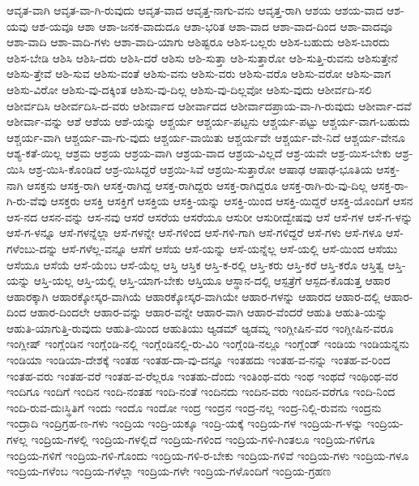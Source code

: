 {ಆವೃತ-ವಾಗಿ
ಆವೃತ-ವಾ-ಗಿ-ರುವುದು
ಆವೃತ-ವಾದ
ಆವೃತ್ತ-ನಾಗು-ವನು
ಆವೃತ್ತ-ರಾಗಿ
ಆಶಯ
ಆಶಯ-ವಾದ
ಆಶ-ಯವು
ಆಶ-ಯವೂ
ಆಶಾ
ಆಶಾ-ಜನಕ-ವಾದುದೂ
ಆಶಾ-ಭರಿತ
ಆಶಾ-ವಾದ
ಆಶಾ-ವಾದ-ದಿಂದ
ಆಶಾ-ವಾದವೂ
ಆಶಾ-ವಾದಿ
ಆಶಾ-ವಾದಿ-ಗಳು
ಆಶಾ-ವಾದಿ-ಯಾಗು
ಆಶಿಷ್ಟರೂ
ಆಶಿಸ-ಬಲ್ಲರು
ಆಶಿಸ-ಬಹುದು
ಆಶಿಸ-ಬಾರದು
ಆಶಿಸ-ಬೇಡಿ
ಆಶಿಸಿ
ಆಶಿಸಿ-ದರು
ಆಶಿಸಿ-ದರೆ
ಆಶಿಸು
ಆಶಿ-ಸುತ್ತಾ
ಆಶಿ-ಸುತ್ತಾರೋ
ಆಶಿ-ಸುತ್ತಿ-ರುವನು
ಆಶಿಸುತ್ತೇನೆ
ಆಶಿಸು-ತ್ತೇವೆ
ಆಶಿ-ಸುವ
ಆಶಿಸು-ವಂತೆ
ಆಶಿಸು-ವನು
ಆಶಿಸು-ವರು
ಆಶಿಸು-ವರೊ
ಆಶಿಸು-ವರೋ
ಆಶಿಸು-ವಾಗ
ಆಶಿಸು-ವಿರೋ
ಆಶಿಸು-ವು-ದಕ್ಕಿಂತ
ಆಶಿಸು-ವು-ದಿಲ್ಲ
ಆಶಿಸು-ವು-ದಿಲ್ಲವೋ
ಆಶಿಸು-ವುದು
ಆಶೀರ್ವದಿ-ಸಲಿ
ಆಶೀರ್ವದಿಸಿ
ಆಶೀರ್ವದಿಸಿ-ದ-ವರು
ಆಶೀರ್ವಾದ
ಆಶೀರ್ವಾದದ
ಆಶೀರ್ವಾದಪ್ರಾಯ-ವಾ-ಗಿ-ರುವುದು
ಆಶೀರ್ವಾ-ದವೆ
ಆಶೀರ್ವಾ-ವನ್ನು
ಆಶೆ
ಆಶೆಯ
ಆಶೆ-ಯನ್ನು
ಆಶ್ಚರ್ಯ
ಆಶ್ಚರ್ಯ-ಪಟ್ಟನು
ಆಶ್ಚರ್ಯ-ಪಟ್ಟು
ಆಶ್ಚರ್ಯ-ವಾಗ-ಬಹುದು
ಆಶ್ಚರ್ಯ-ವಾಗಿ
ಆಶ್ಚರ್ಯ-ವಾ-ಗು-ವುದು
ಆಶ್ಚರ್ಯ-ವಾಯಿತು
ಆಶ್ಚರ್ಯವೇ
ಆಶ್ಚರ್ಯ-ವೇ-ನಿದೆ
ಆಶ್ಚರ್ಯ-ವೇನೂ
ಆಶ್ಯ-ಕತೆ-ಯಿಲ್ಲ
ಆಶ್ರಮ
ಆಶ್ರಯ
ಆಶ್ರಯ-ವಾಗಿ
ಆಶ್ರಯ-ವಾದ
ಆಶ್ರಯ-ವಿಲ್ಲದೆ
ಆಶ್ರ-ಯವೇ
ಆಶ್ರ-ಯಿಸ-ಬೇಕು
ಆಶ್ರ-ಯಿಸಿ
ಆಶ್ರ-ಯಿಸಿ-ಕೊಂಡಿದೆ
ಆಶ್ರ-ಯಿಸಿದ್ದರೆ
ಆಶ್ರಯಿ-ಸಿವೆ
ಆಶ್ರಯಿ-ಸುತ್ತಾರೋ
ಆಷಾಢ
ಆಷಾಢ-ಭೂತಿಯ
ಆಸಕ್ತ-ನಾಗಿ
ಆಸಕ್ತನು
ಆಸಕ್ತ-ರಾಗಿ
ಆಸಕ್ತ-ರಾಗಿದ್ದ
ಆಸಕ್ತ-ರಾಗಿದ್ದರು
ಆಸಕ್ತ-ರಾಗಿದ್ದರೂ
ಆಸಕ್ತ-ರಾಗಿ-ರು-ವು-ದಿಲ್ಲ
ಆಸಕ್ತ-ರಾ-ಗಿ-ರು-ವೆವು
ಆಸಕ್ತರು
ಆಸಕ್ತಿ
ಆಸಕ್ತಿಗೆ
ಆಸಕ್ತಿಯ
ಆಸಕ್ತಿ-ಯನ್ನು
ಆಸಕ್ತಿ-ಯಿಂದ
ಆಸಕ್ತಿ-ಯಿದ್ದರೆ
ಆಸಕ್ತಿ-ಯೊಂದಿಗೆ
ಆಸನ
ಆಸ-ನದ
ಆಸನ-ವನ್ನು
ಆಸ-ನವು
ಆಸರೆ
ಆಸರೆಯ
ಆಸರೆಯೂ
ಆಸುರೀ
ಆಸುರೀದ್ವೇಷವು
ಆಸೆ
ಆಸೆ-ಗಳ
ಆಸೆ-ಗ-ಳನ್ನು
ಆಸೆ-ಗ-ಳನ್ನೂ
ಆಸೆ-ಗಳನ್ನೆಲ್ಲಾ
ಆಸೆ-ಗಳನ್ನೇ
ಆಸೆ-ಗಳಿಂದ
ಆಸೆ-ಗಳಿ-ಗಾಗಿ
ಆಸೆ-ಗಳಿದ್ದರೆ
ಆಸೆ-ಗಳು
ಆಸೆ-ಗಳೂ
ಆಸೆ-ಗಳೆಂಬು-ದನ್ನು
ಆಸೆ-ಗಳೆಲ್ಲ-ವನ್ನೂ
ಆಸೆಗೆ
ಆಸೆಯ
ಆಸೆ-ಯನ್ನು
ಆಸೆ-ಯನ್ನೆಲ್ಲ
ಆಸೆ-ಯಲ್ಲಿ
ಆಸೆ-ಯಿಂದ
ಆಸೆಯು
ಆಸೆಯೂ
ಆಸೆಯೆ
ಆಸೆ-ಯೆಂಬ
ಆಸೆ-ಯೆಲ್ಲ
ಆಸ್ತಿ
ಆಸ್ತಿಕ
ಆಸ್ತಿ-ಕ-ರಲ್ಲಿ
ಆಸ್ತಿ-ಕರು
ಆಸ್ತಿ-ಕರೆ
ಆಸ್ತಿ-ಕರೊ
ಆಸ್ತಿತ್ವ
ಆಸ್ತಿ-ಯನ್ನು
ಆಸ್ತಿ-ಯಲ್ಲ
ಆಸ್ತಿ-ಯಲ್ಲಿ
ಆಸ್ತಿ-ಯಾಗ-ಬೇಕು
ಆಸ್ತಿಯೂ
ಆಸ್ಥಾನ-ದಲ್ಲಿ
ಆಸ್ಪತ್ರೆಗೆ
ಆಸ್ಪದ-ಕೊಡುತ್ತ
ಆಹಾರ
ಆಹಾರಕ್ಕಾಗಿ
ಆಹಾರಕ್ಕೋಸ್ಕರ-ವಾಗಿಯೆ
ಆಹಾರಕ್ಕೋಸ್ಕರ-ವಾಗಿಯೇ
ಆಹಾರ-ಗಳನ್ನು
ಆಹಾರದ
ಆಹಾರ-ದಲ್ಲಿ
ಆಹಾರ-ದಿಂದ
ಆಹಾರ-ದಿಂದಲೇ
ಆಹಾರ-ವನ್ನು
ಆಹಾರ-ವನ್ನೇ
ಆಹಾರ-ವಾಗಿ
ಆಹಾರ-ವೆಂದರೆ
ಆಹುತಿ
ಆಹುತಿ-ಯನ್ನು
ಆಹುತಿ-ಯಾಗುತ್ತಿ-ರುವುದು
ಆಹುತಿ-ಯಿಂದ
ಆಹುತಿಯು
ಆ್ಯಡಮ್
ಆ್ಯಡಮ್ನ
ಇಂಗ್ಲೀಷಿನ-ವರ
ಇಂಗ್ಲೀಷಿನ-ವರೂ
ಇಂಗ್ಲೀಷ್
ಇಂಗ್ಲೆಂಡಿನ
ಇಂಗ್ಲೆಂಡಿ-ನಲ್ಲಿ
ಇಂಗ್ಲೆಂಡಿನಲ್ಲಿ-ರು-ವಿರಿ
ಇಂಗ್ಲೆಂಡಿ-ನಲ್ಲೂ
ಇಂಗ್ಲೆಂಡ್
ಇಂಡಿಯ
ಇಂಡಿಯನ್ನನು
ಇಂಡಿಯಾ
ಇಂಡಿಯಾ-ದೇಶಕ್ಕೆ
ಇಂತಹ
ಇಂತಹ-ದಾ-ವು-ದನ್ನೂ
ಇಂತಹದು
ಇಂತಹ-ವ-ನನ್ನು
ಇಂತಹ-ವ-ರಿಂದ
ಇಂತಹ-ವರು
ಇಂತಹ-ವರೆ
ಇಂತಹ-ವ-ರೆಲ್ಲರೂ
ಇಂತಹು-ದೆಂದು
ಇಂತಿಂಥ-ವರು
ಇಂಥ
ಇಂಥದೆ
ಇಂಥಿಂಥ-ವರ
ಇಂದಿಗೂ
ಇಂದಿಗೆ
ಇಂದಿನ
ಇಂದಿ-ನಂತಹ
ಇಂದಿ-ನಂತೆ
ಇಂದಿನದು
ಇಂದಿನ-ವರು
ಇಂದಿನ-ವರೆಗೂ
ಇಂದಿ-ನಿಂದ
ಇಂದಿ-ರುವ-ದುಃಸ್ಥಿತಿಗೆ
ಇಂದು
ಇಂದೊ
ಇಂದೋ
ಇಂದ್ರ
ಇಂದ್ರನ
ಇಂದ್ರ-ನಲ್ಲ
ಇಂದ್ರ-ನಿಲ್ಲಿ-ರುವನು
ಇಂದ್ರನು
ಇಂದ್ರಾದಿ
ಇಂದ್ರಿಗ್ರಹ-ಣ-ಗಳು
ಇಂದ್ರಿಯ
ಇಂದ್ರಿ-ಯಕ್ಕೂ
ಇಂದ್ರಿ-ಯಕ್ಕೆ
ಇಂದ್ರಿಯ-ಗಳ
ಇಂದ್ರಿಯ-ಗ-ಳನ್ನು
ಇಂದ್ರಿಯ-ಗಳಲ್ಲ
ಇಂದ್ರಿಯ-ಗಳಲ್ಲಿ
ಇಂದ್ರಿಯ-ಗಳಲ್ಲಿದೆ
ಇಂದ್ರಿಯ-ಗಳಿಂದ
ಇಂದ್ರಿಯ-ಗಳಿ-ಗಿಂತಲೂ
ಇಂದ್ರಿಯ-ಗಳಿಗೂ
ಇಂದ್ರಿಯ-ಗಳಿಗೆ
ಇಂದ್ರಿಯ-ಗಳಿ-ಗೊಂದು
ಇಂದ್ರಿಯ-ಗಳಿ-ರ-ಬೇಕು
ಇಂದ್ರಿಯ-ಗಳಿವೆ
ಇಂದ್ರಿಯ-ಗಳು
ಇಂದ್ರಿಯ-ಗಳೂ
ಇಂದ್ರಿಯ-ಗಳೆಂಬ
ಇಂದ್ರಿಯ-ಗಳೆಲ್ಲಾ
ಇಂದ್ರಿಯ-ಗಳೇ
ಇಂದ್ರಿಯ-ಗಳೊಂದಿಗೆ
ಇಂದ್ರಿಯ-ಗ್ರಹಣ
}

